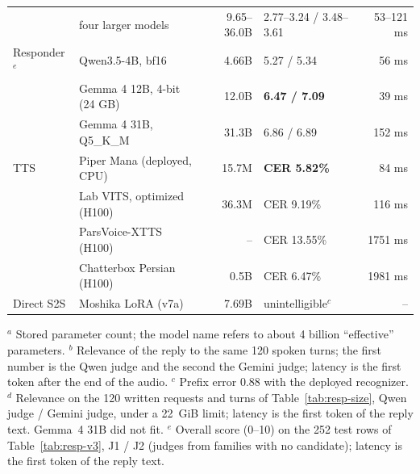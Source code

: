 \begin{table}[ht]
\begin{tabular}{llrlr}
 & four larger models & 9.65--36.0B & 2.77--3.24 / 3.48--3.61 & 53--121 ms \\
Responder$^{e}$ & Qwen3.5-4B, bf16 & 4.66B & 5.27 / 5.34 & 56 ms \\
 & Gemma 4 12B, 4-bit (24 GB) & 12.0B & \textbf{6.47 / 7.09} & 39 ms \\
 & Gemma 4 31B, Q5\_K\_M & 31.3B & 6.86 / 6.89 & 152 ms \\
\midrule
TTS & Piper Mana (deployed, CPU) & 15.7M & \textbf{CER 5.82\%} & 84 ms \\
 & Lab VITS, optimized (H100) & 36.3M & CER 9.19\% & 116 ms \\
 & ParsVoice-XTTS (H100) & -- & CER 13.55\% & 1751 ms \\
 & Chatterbox Persian (H100) & 0.5B & CER 6.47\% & 1981 ms \\
\midrule
Direct S2S & Moshika LoRA (v7a) & 7.69B & unintelligible$^{c}$ & -- \\
\bottomrule
\end{tabular}
\par\smallskip\footnotesize
$^{a}$ Stored parameter count; the model name refers to about 4 billion ``effective''
parameters.
$^{b}$ Relevance of the reply to the same 120 spoken turns; the first number is the Qwen judge
and the second the Gemini judge; latency is the first token after the end of the audio.
$^{c}$ Prefix error 0.88 with the deployed recognizer.
$^{d}$ Relevance on the 120 written requests and turns of Table~\ref{tab:resp-size}, Qwen
judge / Gemini judge, under a 22~GiB limit; latency is the first token of the reply text.
Gemma~4 31B did not fit.
$^{e}$ Overall score (0--10) on the 252 test rows of Table~\ref{tab:resp-v3}, J1 / J2 (judges from
families with no candidate); latency is the first token of the reply text.
\end{table}

